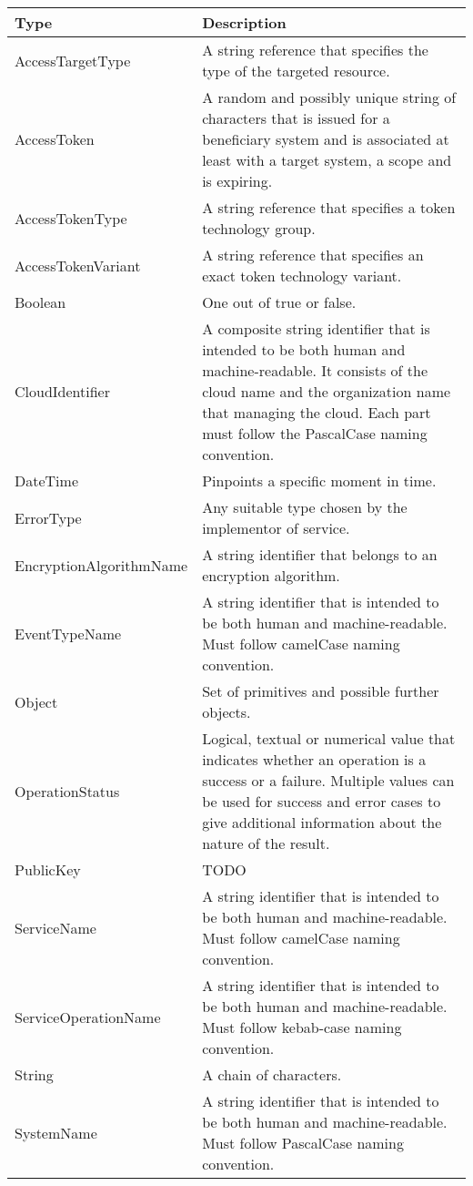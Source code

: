 \documentclass[a4paper]{arrowhead}
\newcommand{\pdef}[1]{{\textcolor{ArrowheadGrey}{#1\label{sec:model:primitives:#1}\label{sec:model:primitives:#1s}\label{sec:model:primitives:#1es}}}}
\begin{document}
\begin{table}[ht!]
\begin{tabularx}{\textwidth}{| p{5cm} | X |} \hline
\rowcolor{gray!33} Type & Description \\ \hline
\pdef{AccessTargetType} & A string reference that specifies the type of the targeted resource. \\ \hline
\pdef{AccessToken} & A random and possibly unique string of characters that is issued for a beneficiary system and is associated at least with a target system, a scope and is expiring.\\ \hline
\pdef{AccessTokenType} & A string reference that specifies a token technology group.\\ \hline
\pdef{AccessTokenVariant} & A string reference that specifies an exact token technology variant.\\ \hline
\pdef{Boolean}          & One out of true or false. \\ \hline
\pdef{CloudIdentifier} & A composite string identifier that is intended to be both human and machine-readable. It consists of the cloud name and the organization name that managing the cloud. Each part must follow the PascalCase naming convention. \\ \hline
\pdef{DateTime}         & Pinpoints a specific moment in time. \\ \hline
\pdef{ErrorType}        & Any suitable type chosen by the implementor of service. \\ \hline
\pdef{EncryptionAlgorithmName} & A string identifier that belongs to an encryption algorithm. \\ \hline
\pdef{EventTypeName}      & A string identifier that is intended to be both human and machine-readable. Must follow camelCase naming convention. \\ \hline
\pdef{Object}           & Set of primitives and possible further objects. \\ \hline
\pdef{OperationStatus}  & Logical, textual or numerical value that indicates whether an operation is a success or a failure. Multiple values can be used for success and error cases to give additional information about the nature of the result. \\ \hline
\pdef{PublicKey} & TODO \\ \hline
\pdef{ServiceName}      & A string identifier that is intended to be both human and machine-readable. Must follow camelCase naming convention. \\ \hline
\pdef{ServiceOperationName} & A string identifier that is intended to be both human and machine-readable. Must follow kebab-case naming convention. \\ \hline
\pdef{String}           & A chain of characters. \\ \hline
\pdef{SystemName}       & A string identifier that is intended to be both human and machine-readable. Must follow PascalCase naming convention. \\ \hline
\end{tabularx}
\end{table}
\end{document}

